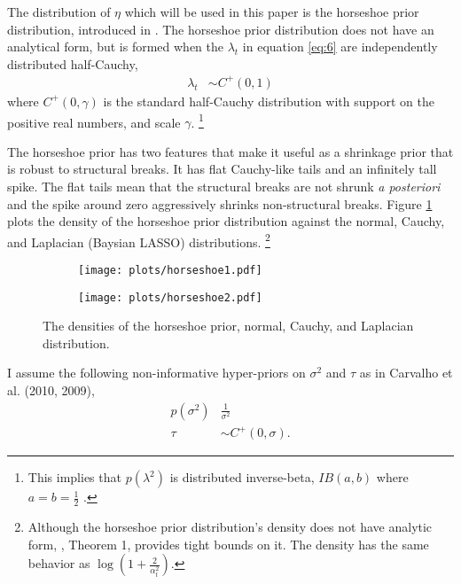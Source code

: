 \documentclass{article}
\begin{document}
The distribution of $\eta$ which will be used in this paper is the horseshoe prior distribution, introduced in \textcites{CarvalhoPolsonScott2009}{CarvalhoPolsonScott2010}.
The horseshoe prior distribution does not have an analytical form, but is formed when the $\lambda_{t}$ in equation \eqref{eq:6} are independently distributed half-Cauchy,
\begin{align}
  \label{eq:13}
  \lambda_{t} &\sim C^{+}(0, 1)
\end{align}
where $C^{+}(0, \gamma)$ is the standard half-Cauchy distribution with support on the positive real numbers, and scale $\gamma$.%
\footnote{
  This implies that $p(\lambda^{2})$ is distributed inverse-beta, $IB(a, b)$ where $a = b = \frac{1}{2}$ \parencite[4]{PolsonScott2010}. 
}

The horseshoe prior has two features that make it useful as a shrinkage prior that is robust to structural breaks.
It has flat Cauchy-like tails and an infinitely tall spike.
The flat tails mean that the structural breaks are not shrunk \textit{a posteriori} and the spike around zero aggressively shrinks non-structural breaks.
Figure \ref{fig:horseshoe} plots the density of the horseshoe prior distribution against the normal, Cauchy, and Laplacian (Baysian LASSO) distributions.%
\footnote{
  Although the horseshoe prior distribution's density does not have analytic form, \textcite{CarvalhoPolsonScott2010}, Theorem 1, provides tight bounds on it.
  The density has the same behavior as $\log (1 + \frac{2}{\alpha_{t}^{2}})$.
}

\begin{figure}
  \centering
  \begin{subfigure}[b]{0.5\textwidth}
    \texttt{[image: plots/horseshoe1.pdf]}
  \end{subfigure}%
  \begin{subfigure}[b]{0.5\textwidth}
    \texttt{[image: plots/horseshoe2.pdf]}
  \end{subfigure}
  \caption{The densities of the horseshoe prior, normal, Cauchy, and Laplacian distribution.}
  \label{fig:horseshoe}
\end{figure}

I assume the following non-informative hyper-priors on $\sigma^{2}$ and $\tau$ as in Carvalho et al. (2010, 2009),
\begin{align}
  \label{eq:9}
  p(\sigma^{2}) & \frac{1}{\sigma^{2}}  \\
  \label{eq:11}
  \tau &\sim C^{+}(0, \sigma) \text{.}
\end{align}
\end{document}
